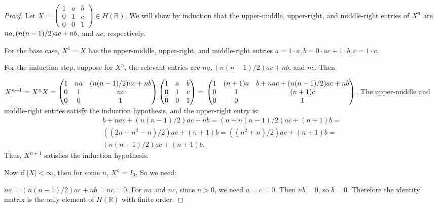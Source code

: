 \documentclass{article}
\begin{document}
\begin{enumerate}[label=(\alph*)]
          \begin{proof}
            Let $X = \begin{pmatrix}1 & a & b \\ 0 & 1 & c \\ 0 & 0 & 1\end{pmatrix} \in H(\mathbb{R})$. We will show by induction that the upper-middle, upper-right, and middle-right entries of $X^n$ are $na, \newline (n(n - 1)/2)ac + nb$, and $nc$, respectively.

            For the base case, $X^1 = X$ has the upper-middle, upper-right, and middle-right entries $a = 1 \cdot a, b = 0 \cdot ac + 1 \cdot b, c = 1 \cdot c$.

            For the induction step, suppose for $X^n$, the relevant entries are $na, (n(n - 1)/2)ac + nb$, and $nc$. Then
            
            $X^{n + 1} = X^n X = \begin{pmatrix}1 & na & (n(n - 1)/2)ac + nb \\ 0 & 1 & nc \\ 0 & 0 & 1\end{pmatrix}\begin{pmatrix}1 & a & b \\ 0 & 1 & c \\ 0 & 0 & 1\end{pmatrix} = \\ \begin{pmatrix}1 & (n + 1)a & b + nac + (n(n - 1)/2)ac + nb \\ 0 & 1 & (n + 1)c \\ 0 & 0 & 1\end{pmatrix}$. The upper-middle and middle-right entries satisfy the induction hypothesis, and the upper-right entry is:
            \begin{multline*}
                b + nac + (n(n - 1)/2)ac + nb = (n + n(n - 1)/2)ac + (n + 1)b = \\
                ((2n + n^2 - n)/2)ac + (n + 1)b = ((n^2 + n)/2)ac + (n + 1)b = \\
                (n(n + 1)/2)ac + (n + 1)b.
            \end{multline*}
            Thus, $X^{n + 1}$ satisfies the induction hypothesis.

            Now if $|X| < \infty$, then for some $n$, $X^n = I_3$. So we need:
            
            $na = (n(n - 1)/2)ac + nb = nc = 0$. For $na$ and $nc$, since $n > 0$, we need $a = c = 0$. Then $nb = 0$, so $b = 0$. Therefore the identity matrix is the only element of $H(\mathbb{R})$ with finite order.
          \end{proof}
\end{enumerate}
\end{document}
